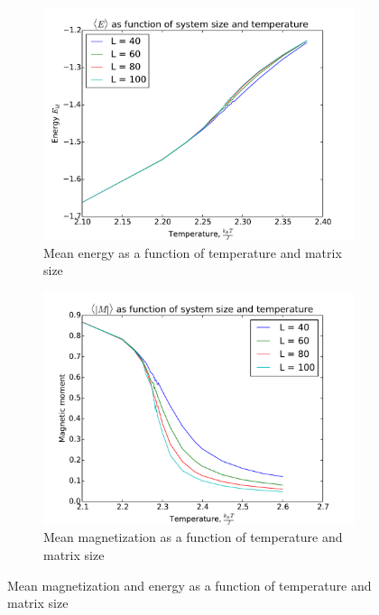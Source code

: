 	\begin{figure}[H]
	\begin{subfigure}[b]{0.5\textwidth}
	\includegraphics[width=1\linewidth]{../results/4e/4e_energy}
\caption{Mean energy as a function of temperature and matrix size}
\label{fig:4eenergy}
	\end{subfigure}
	\hfill
	\begin{subfigure}[b]{0.5\textwidth}
	\includegraphics[width=1\linewidth]{../results/4e/4e_mag}
\caption{Mean magnetization as a function of temperature and matrix size}
\label{fig:4emag}
	\end{subfigure}
	\caption{Mean magnetization and energy as a function of temperature and matrix size}
\end{figure}

